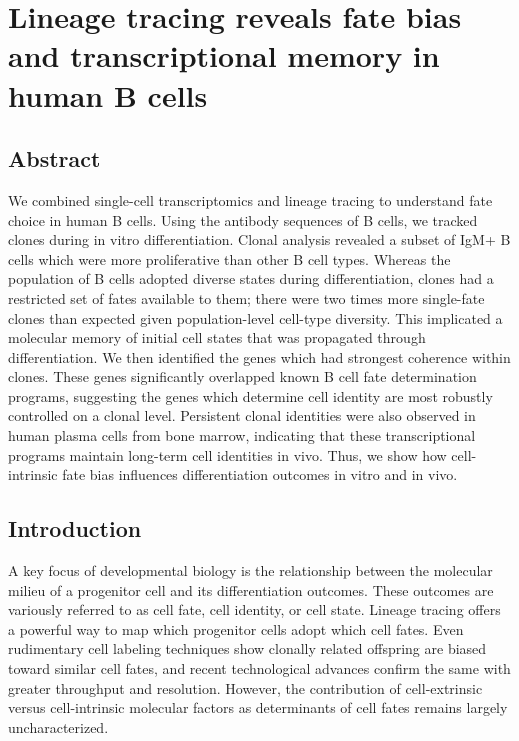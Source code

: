 \chapter{Lineage tracing reveals fate bias and transcriptional memory in human B cells}

\section{Abstract}
We combined single-cell transcriptomics and lineage tracing to understand fate choice in human B cells. Using the antibody sequences of B cells, we tracked clones during in vitro differentiation. Clonal analysis revealed a subset of IgM+ B cells which were more proliferative than other B cell types. Whereas the population of B cells adopted diverse states during differentiation, clones had a restricted set of fates available to them; there were two times more single-fate clones than expected given population-level cell-type diversity. This implicated a molecular memory of initial cell states that was propagated through differentiation. We then identified the genes which had strongest coherence within clones. These genes significantly overlapped known B cell fate determination programs, suggesting the genes which determine cell identity are most robustly controlled on a clonal level. Persistent clonal identities were also observed in human plasma cells from bone marrow, indicating that these transcriptional programs maintain long-term cell identities in vivo. Thus, we show how cell-intrinsic fate bias influences differentiation outcomes in vitro and in vivo. 

\section{Introduction}
A key focus of developmental biology is the relationship between the molecular milieu of a progenitor cell and its differentiation outcomes. These outcomes are variously referred to as cell fate, cell identity, or cell state. Lineage tracing offers a powerful way to map which progenitor cells adopt which cell fates. Even rudimentary cell labeling techniques show clonally related offspring are biased toward similar cell fates\cite{whitman_embryology_1878}, and recent technological advances confirm the same with greater throughput and resolution. However, the contribution of cell-extrinsic versus cell-intrinsic molecular factors as determinants of cell fates remains largely uncharacterized.

